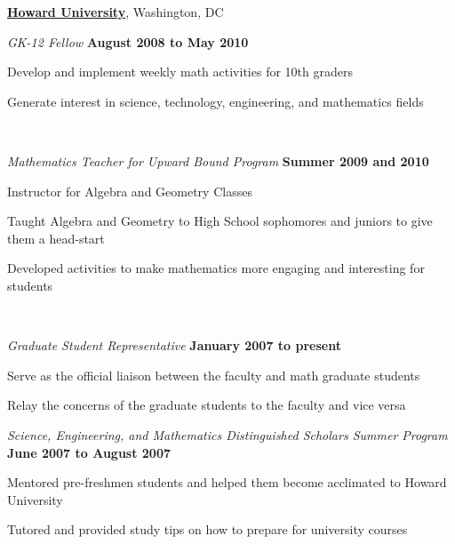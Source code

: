 \documentclass[10pt]{article}
\newenvironment{outerlist}[1][\enskip\textbullet]%
        {\begin{itemize}[#1]}{\end{itemize}%
         \vspace{-.6\baselineskip}}
\newenvironment{innerlist}[1][\enskip\textbullet]%
        {\begin{compactitem}[#1]}{\end{compactitem}}
\begin{document}
\href{http://www.howard.edu}{\textbf{Howard University}},
Washington, DC
\begin{outerlist}
\item[] \textit{GK-12 Fellow}%
        \hfill \textbf{August 2008 to May 2010}
\begin{innerlist}
	\item Develop and implement weekly math activities for 10th graders
	
	\item Generate interest in science, technology, engineering, and 
	mathematics fields
\end{innerlist}~

\item[] \textit{Mathematics Teacher for Upward Bound Program}%
    \hfill \textbf{Summer 2009 and 2010}
    \begin{innerlist}
        \item Instructor for Algebra and Geometry Classes       
        \begin{innerlist}
            \item Taught Algebra and Geometry to High School sophomores and 
            	juniors to give them a head-start 
						
						\item Developed activities to make mathematics more engaging and 
						interesting for students
        \end{innerlist}~

\end{innerlist}




\item[] \textit{Graduate Student Representative}%
        \hfill \textbf{January 2007 to present}
\begin{innerlist}
\item Serve as the official liaison between the faculty and math graduate 
students
\item Relay the concerns of the graduate students to the faculty and vice 
versa
\end{innerlist}

\item[] \textit{Science, Engineering, and Mathematics Distinguished Scholars 
Summer Program}%
        \hfill \textbf{June 2007 to August 2007}
\begin{innerlist}
\item Mentored pre-freshmen students and helped them become acclimated to Howard 
University

\item Tutored and provided study tips on how to prepare for university 
courses
\end{innerlist}

\end{outerlist}
\end{document}
